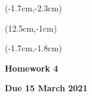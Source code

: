 \documentclass[12pt, oneside]{article}
\begin{document}
\begin{textblock*}{4cm}(-1.7cm,-2.3cm)
\end{textblock*}

\begin{textblock*}{8cm}(12.5cm,-1cm)
\end{textblock*}
\begin{textblock*}{13.5cm}(-1.7cm,-1.8cm)
\end{textblock*}

\vspace{1cm}

\begin{center}
\textbf{\Large Homework 4}

\textbf{Due 15 March 2021}
\end{center}
\end{document}
